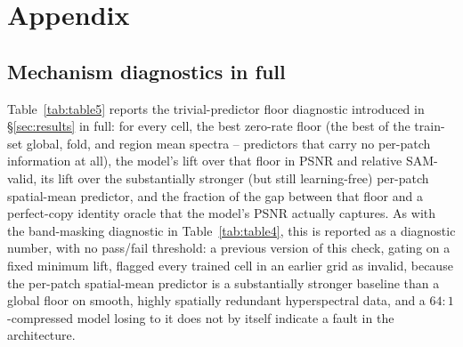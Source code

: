 \documentclass{article} %
\newcommand{\tbd}{--}
\begin{document}



\appendix
\section{Appendix}

\subsection{Mechanism diagnostics in full}
\label{app:diagnostics}

Table~\ref{tab:table5} reports the trivial-predictor floor diagnostic introduced in \S\ref{sec:results} in full: for every cell, the best zero-rate floor (the best of the train-set global, fold, and region mean spectra -- predictors that carry no per-patch information at all), the model's lift over that floor in PSNR and relative SAM-valid, its lift over the substantially stronger (but still learning-free) per-patch spatial-mean predictor, and the fraction of the gap between that floor and a perfect-copy identity oracle that the model's PSNR actually captures. As with the band-masking diagnostic in Table~\ref{tab:table4}, this is reported as a diagnostic number, with no pass/fail threshold: a previous version of this check, gating on a fixed minimum lift, flagged every trained cell in an earlier grid as invalid, because the per-patch spatial-mean predictor is a substantially stronger baseline than a global floor on smooth, highly spatially redundant hyperspectral data, and a $64{:}1$-compressed model losing to it does not by itself indicate a fault in the architecture.

\begin{table}[h]
\centering
\small
{}
\caption{Trivial-predictor floor diagnostic (P1), diagnostic only, no pass/fail threshold. Cells marked ``\tbd{}'' await the pending re-evaluation pass noted in the main text.}
\label{tab:table5}
\end{table}
\end{document}
